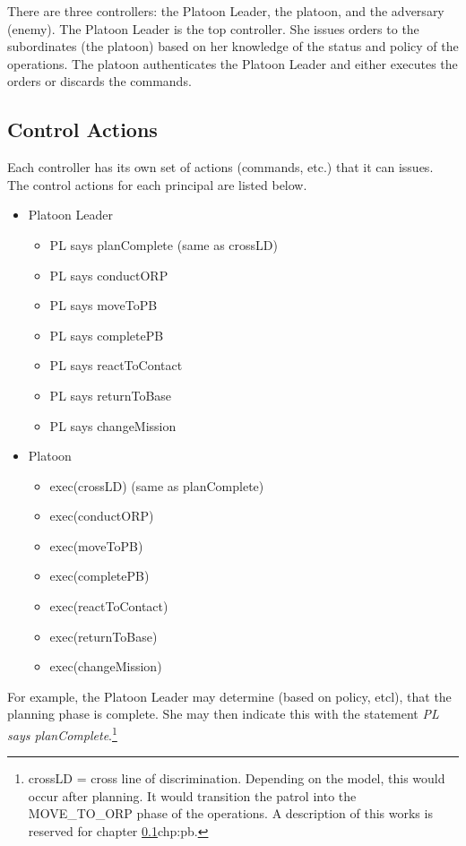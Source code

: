 \documentclass[../../main/main.tex]{subfiles}
\begin{document}
 There are three controllers: the Platoon Leader, the platoon, and the adversary (enemy).  The Platoon Leader is the top controller. She issues orders to the subordinates (the platoon) based on her knowledge of the status and policy of the operations.  The platoon authenticates the Platoon Leader and either executes the orders or discards the commands.
\clearpage

\subsection{Control Actions}
Each controller has its own set of actions (commands, etc.) that it can issues.  The control actions for each principal are listed below.  
\begin{itemize}
\item Platoon Leader
\begin{itemize}
\item PL says planComplete (same as crossLD)
\item PL says conductORP
\item PL says moveToPB
\item PL says completePB
\item PL says reactToContact
\item PL says returnToBase
\item PL says changeMission
\end{itemize}
\item Platoon
\begin{itemize}
\item exec(crossLD) (same as planComplete)
\item exec(conductORP)
\item exec(moveToPB)
\item exec(completePB)
\item exec(reactToContact)
\item exec(returnToBase)
\item exec(changeMission)
\end{itemize}

\end{itemize}

For example, the Platoon Leader may determine (based on policy, etcl), that the planning phase is complete.  She may then indicate this with the statement \textit{PL says planComplete}.\footnote{crossLD = cross line of discrimination.  Depending on the model, this would occur after planning.  It would transition the patrol into the MOVE_TO_ORP phase of the operations.  A description of this works is reserved for chapter \ref{}chp:pb.}
\end{document}
